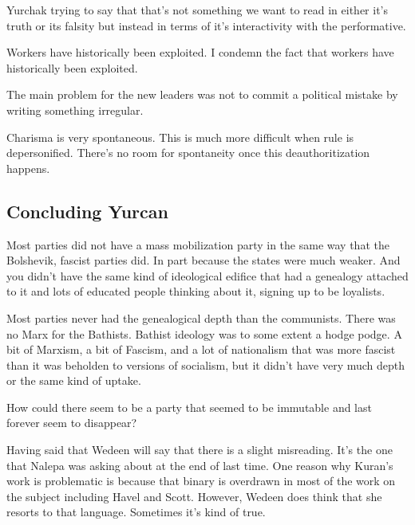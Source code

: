 \documentclass{article}
\begin{document}
\vspace{3mm}

Yurchak trying to say that that's not something we want to read in either it's truth or its falsity but instead in terms of it's interactivity with the performative.  

\vspace{3mm}

Workers have historically been exploited.  I condemn the fact that workers have historically been exploited.  

\vspace{3mm}

The main problem for the new leaders was not to commit a political mistake by writing something irregular.  

\vspace{3mm}

Charisma is very spontaneous.  This is much more difficult when rule is depersonified.  There's no room for spontaneity once this deauthoritization happens.  

\subsection{Concluding Yurcan}

Most parties did not have a mass mobilization party in the same way that the Bolshevik, fascist parties did.  In part because the states were much weaker.  And you didn't have the same kind of ideological edifice that had a genealogy attached to it and lots of educated people thinking about it, signing up to be loyalists.  

\vspace{3mm}

Most parties never had the genealogical depth than the communists.  There was no Marx for the Bathists.  Bathist ideology was to some extent a hodge podge.  A bit of Marxism, a bit of Fascism, and a lot of nationalism that was more fascist than it was beholden to versions of socialism, but it didn't have very much depth or the same kind of uptake.  

\vspace{3mm}

How could there seem to be a party that seemed to be immutable and last forever seem to disappear?  

\vspace{3mm}

Having said that Wedeen will say that there is a slight misreading.  It's the one that Nalepa was asking about at the end of last time.  One reason why Kuran's work is problematic is because that binary is overdrawn in most of the work on the subject including Havel and Scott.  However, Wedeen does think that she resorts to that language.  Sometimes it's kind of true.  
\end{document}
